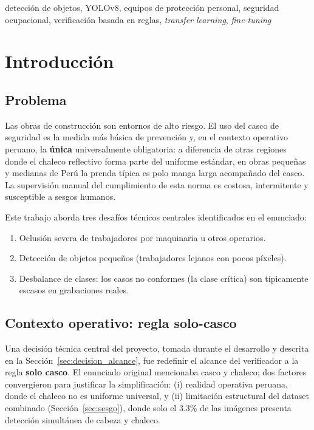 \documentclass[conference]{IEEEtran}
\begin{document}
\begin{IEEEkeywords}
detección de objetos, YOLOv8, equipos de protección personal,
seguridad ocupacional, verificación basada en reglas,
\textit{transfer learning}, \textit{fine-tuning}
\end{IEEEkeywords}

\section{Introducción}

\subsection{Problema}

Las obras de construcción son entornos de alto riesgo. El uso del
casco de seguridad es la medida más básica de prevención y, en el
contexto operativo peruano, la \textbf{única} universalmente
obligatoria: a diferencia de otras regiones donde el chaleco
reflectivo forma parte del uniforme estándar, en obras pequeñas y
medianas de Perú la prenda típica es polo manga larga acompañado
del casco. La supervisión manual del cumplimiento de esta norma es
costosa, intermitente y susceptible a sesgos humanos.

Este trabajo aborda tres desafíos técnicos centrales identificados
en el enunciado:
\begin{enumerate}
    \item Oclusión severa de trabajadores por maquinaria u otros
    operarios.
    \item Detección de objetos pequeños (trabajadores lejanos con
    pocos píxeles).
    \item Desbalance de clases: los casos no conformes (la clase
    crítica) son típicamente escasos en grabaciones reales.
\end{enumerate}

\subsection{Contexto operativo: regla solo-casco}
\label{sec:contexto}

Una decisión técnica central del proyecto, tomada durante el
desarrollo y descrita en la Sección~\ref{sec:decision_alcance},
fue redefinir el alcance del verificador a la regla
\textbf{solo casco}. El enunciado original mencionaba casco y
chaleco; dos factores convergieron para justificar la simplificación:
(i) realidad operativa peruana, donde el chaleco no es uniforme
universal, y (ii) limitación estructural del dataset combinado
(Sección~\ref{sec:sesgo}), donde solo el 3.3\% de las imágenes
presenta detección simultánea de cabeza y chaleco.
\end{document}
